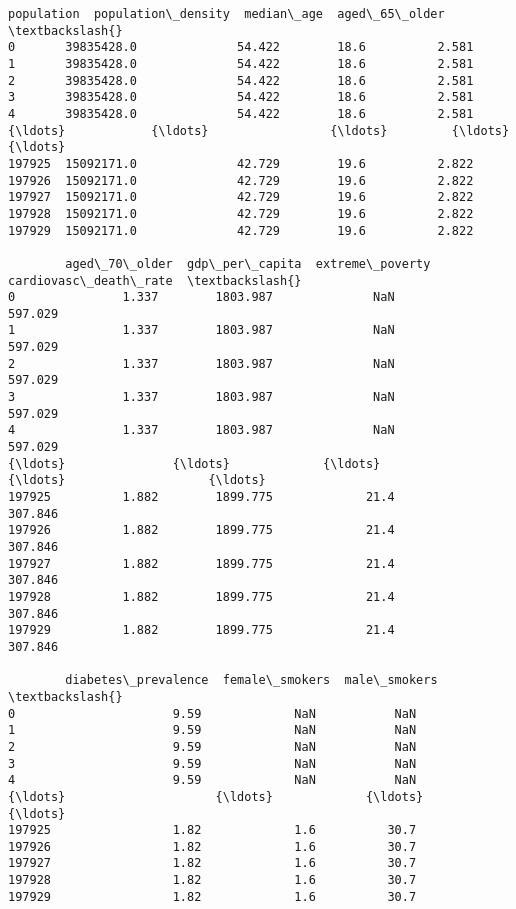 \documentclass[11pt]{article}
\begin{document}
\begin{tcolorbox}[breakable, size=fbox, boxrule=.5pt, pad at break*=1mm, opacityfill=0]
\begin{Verbatim}[commandchars=\\\{\}]
        population  population\_density  median\_age  aged\_65\_older  \textbackslash{}
0       39835428.0              54.422        18.6          2.581
1       39835428.0              54.422        18.6          2.581
2       39835428.0              54.422        18.6          2.581
3       39835428.0              54.422        18.6          2.581
4       39835428.0              54.422        18.6          2.581
{\ldots}            {\ldots}                 {\ldots}         {\ldots}            {\ldots}
197925  15092171.0              42.729        19.6          2.822
197926  15092171.0              42.729        19.6          2.822
197927  15092171.0              42.729        19.6          2.822
197928  15092171.0              42.729        19.6          2.822
197929  15092171.0              42.729        19.6          2.822

        aged\_70\_older  gdp\_per\_capita  extreme\_poverty  cardiovasc\_death\_rate  \textbackslash{}
0               1.337        1803.987              NaN                597.029
1               1.337        1803.987              NaN                597.029
2               1.337        1803.987              NaN                597.029
3               1.337        1803.987              NaN                597.029
4               1.337        1803.987              NaN                597.029
{\ldots}               {\ldots}             {\ldots}              {\ldots}                    {\ldots}
197925          1.882        1899.775             21.4                307.846
197926          1.882        1899.775             21.4                307.846
197927          1.882        1899.775             21.4                307.846
197928          1.882        1899.775             21.4                307.846
197929          1.882        1899.775             21.4                307.846

        diabetes\_prevalence  female\_smokers  male\_smokers  \textbackslash{}
0                      9.59             NaN           NaN
1                      9.59             NaN           NaN
2                      9.59             NaN           NaN
3                      9.59             NaN           NaN
4                      9.59             NaN           NaN
{\ldots}                     {\ldots}             {\ldots}           {\ldots}
197925                 1.82             1.6          30.7
197926                 1.82             1.6          30.7
197927                 1.82             1.6          30.7
197928                 1.82             1.6          30.7
197929                 1.82             1.6          30.7


\end{Verbatim}
\end{tcolorbox}
\end{document}
